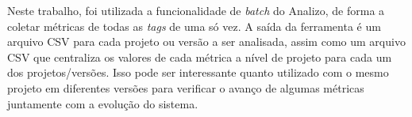 Neste trabalho, foi utilizada a funcionalidade de \textit{batch} do Analizo, de forma a coletar métricas de todas as \textit{tags} de uma só vez. A saída da ferramenta é um arquivo CSV para cada projeto ou versão a ser analisada, assim como um arquivo CSV que centraliza os valores de cada métrica a nível de projeto para cada um dos projetos/versões. Isso pode ser interessante quanto utilizado com o mesmo projeto em diferentes versões para verificar o avanço de algumas métricas juntamente com a evolução do sistema.